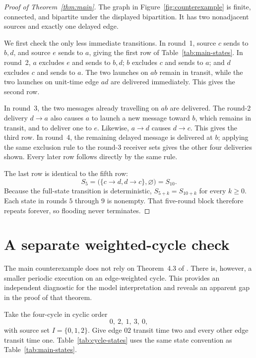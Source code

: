 \documentclass[11pt]{article}
\newcommand{\delivers}{\mathrel{\to}}
\begin{document}
\begin{proof}[Proof of Theorem~\ref{thm:main}]
The graph in Figure~\ref{fig:counterexample} is finite, connected, and
bipartite under the displayed bipartition.  It has two nonadjacent sources
and exactly one delayed edge.

We first check the only less immediate transitions.  In round~1, source \(c\)
sends to \(b,d\), and source \(e\) sends to \(a\), giving the first row of
Table~\ref{tab:main-states}.  In round~2, \(a\) excludes \(e\) and sends to
\(b,d\); \(b\) excludes \(c\) and sends to \(a\); and \(d\) excludes \(c\)
and sends to \(a\).  The two launches on \(ab\) remain in transit, while the
two launches on unit-time edge \(ad\) are delivered immediately.  This gives
the second row.

In round~3, the two messages already travelling on \(ab\) are delivered.
The round-2 delivery \(d\delivers a\) also causes \(a\) to launch a new
message toward \(b\), which remains in transit, and to deliver one to \(e\).
Likewise, \(a\delivers d\) causes \(d\delivers c\).  This gives the third
row.  In round~4, the remaining delayed message is delivered at \(b\);
applying the same exclusion rule to the round-3 receiver sets gives the
other four deliveries shown.  Every later row follows directly by the same
rule.

The last row is identical to the fifth row:
\[
S_5=\bigl(\{c\delivers d,d\delivers c\},\varnothing\bigr)=S_{10}.
\]
Because the full-state transition is deterministic,
\(S_{5+k}=S_{10+k}\) for every \(k\geq 0\).  Each state in rounds \(5\)
through \(9\) is nonempty.  That five-round block therefore repeats forever,
so flooding never terminates.
\end{proof}

\section{A separate weighted-cycle check}\label{sec:cycle}

The main counterexample does not rely on Theorem~4.3 of \cite{HT2023}.
There is, however, a smaller periodic execution on an edge-weighted cycle.
This provides an independent diagnostic for the model interpretation and
reveals an apparent gap in the proof of that theorem.

Take the four-cycle in cyclic order
\[
0,\ 2,\ 1,\ 3,\ 0,
\]
with source set \(I=\{0,1,2\}\).  Give edge \(02\) transit time two and every
other edge transit time one.  Table~\ref{tab:cycle-states} uses the same
state convention as Table~\ref{tab:main-states}.
\end{document}
